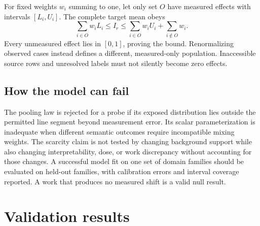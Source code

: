 \documentclass[11pt,letterpaper]{article}
\theoremstyle{definition}\newtheorem{definition}[theorem]{Definition}
\begin{document}
For fixed weights $w_i$ summing to one, let only set $O$ have measured effects with intervals $[L_i,U_i]$. The complete target mean obeys
\begin{equation}
\sum_{i\in O}w_iL_i\le I_r\le
\sum_{i\in O}w_iU_i+\sum_{i\notin O}w_i.
\label{eq:missing}
\end{equation}
Every unmeasured effect lies in $[0,1]$, proving the bound. Renormalizing observed cases instead defines a different, measured-only population. Inaccessible source rows and unresolved labels must not silently become zero effects.

\subsection{How the model can fail}
The pooling law is rejected for a probe if its exposed distribution lies outside the permitted line segment beyond measurement error. Its scalar parameterization is inadequate when different semantic outcomes require incompatible mixing weights. The scarcity claim is not tested by changing background support while also changing interpretability, dose, or work discrepancy without accounting for those changes. A successful model fit on one set of domain families should be evaluated on held-out families, with calibration errors and interval coverage reported. A work that produces no measured shift is a valid null result.

\section{Validation results}
\end{document}
